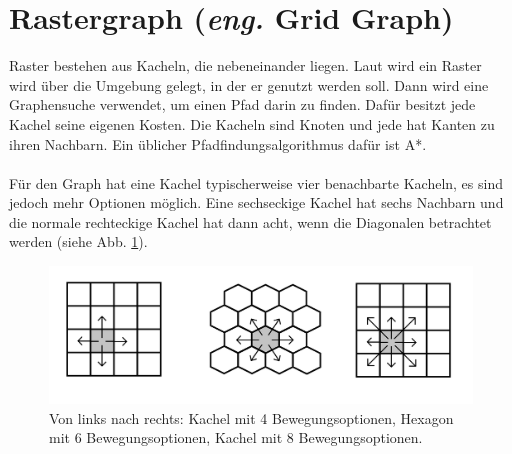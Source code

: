 \section{Rastergraph (\textit{eng.} Grid Graph)}
Raster bestehen aus Kacheln, die nebeneinander liegen. Laut \cite{Grid:02} wird ein Raster wird über die Umgebung gelegt, in der er genutzt werden soll. Dann wird eine Graphensuche verwendet, um einen Pfad darin zu finden. Dafür besitzt jede Kachel seine eigenen Kosten. Die Kacheln sind Knoten und jede hat Kanten zu ihren Nachbarn. Ein üblicher Pfadfindungsalgorithmus dafür ist A*.
\\\\
Für den Graph hat eine Kachel typischerweise vier benachbarte Kacheln, es sind jedoch mehr Optionen möglich. Eine sechseckige Kachel hat sechs Nachbarn und die normale rechteckige Kachel hat dann acht, wenn die Diagonalen betrachtet werden (siehe Abb. \ref{sec2a}).
\begin{figure} %
	\centering
	\includegraphics[width=\textwidth]{images/Grid_Tiles.png}
	\caption{Von links nach rechts: Kachel mit 4 Bewegungsoptionen, Hexagon mit 6 Bewegungsoptionen, Kachel mit 8 Bewegungsoptionen.}
	\label{sec2a}
\end{figure}


